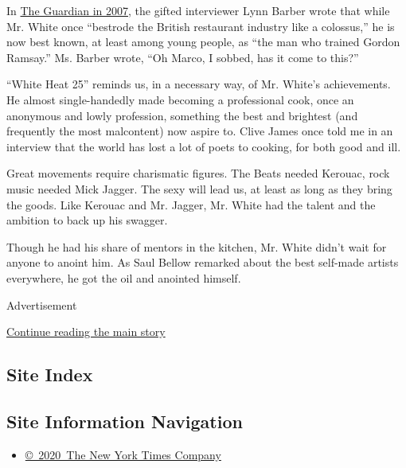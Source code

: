 In
\href{http://www.theguardian.com/lifeandstyle/2007/oct/21/foodanddrink.features9}{The
Guardian in 2007}, the gifted interviewer Lynn Barber wrote that while
Mr. White once ``bestrode the British restaurant industry like a
colossus,'' he is now best known, at least among young people, as ``the
man who trained Gordon Ramsay.'' Ms. Barber wrote, ``Oh Marco, I sobbed,
has it come to this?''

``White Heat 25'' reminds us, in a necessary way, of Mr. White's
achievements. He almost single-handedly made becoming a professional
cook, once an anonymous and lowly profession, something the best and
brightest (and frequently the most malcontent) now aspire to. Clive
James once told me in an interview that the world has lost a lot of
poets to cooking, for both good and ill.

Great movements require charismatic figures. The Beats needed Kerouac,
rock music needed Mick Jagger. The sexy will lead us, at least as long
as they bring the goods. Like Kerouac and Mr. Jagger, Mr. White had the
talent and the ambition to back up his swagger.

Though he had his share of mentors in the kitchen, Mr. White didn't wait
for anyone to anoint him. As Saul Bellow remarked about the best
self-made artists everywhere, he got the oil and anointed himself.

Advertisement

\protect\hyperlink{after-bottom}{Continue reading the main story}

\hypertarget{site-index}{%
\subsection{Site Index}\label{site-index}}

\hypertarget{site-information-navigation}{%
\subsection{Site Information
Navigation}\label{site-information-navigation}}

\begin{itemize}
\tightlist
\item
  \href{https://help.nytimes.com/hc/en-us/articles/115014792127-Copyright-notice}{©~2020~The
  New York Times Company}
\end{itemize}


